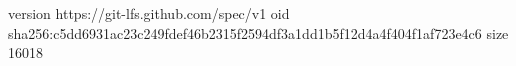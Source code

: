 version https://git-lfs.github.com/spec/v1
oid sha256:c5dd6931ac23c249fdef46b2315f2594df3a1dd1b5f12d4a4f404f1af723e4c6
size 16018
